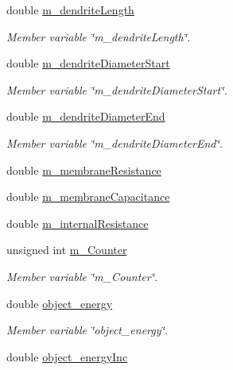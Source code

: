 \begin{DoxyCompactItemize}
\item 
double \mbox{\hyperlink{classDendriteBranch_a0f736fff956d287d66d060865ef0a254}{m\+\_\+dendrite\+Length}}
\begin{DoxyCompactList}\small\item\em Member variable \char`\"{}m\+\_\+dendrite\+Length\char`\"{}. \end{DoxyCompactList}\item 
double \mbox{\hyperlink{classDendriteBranch_a48ffaeeca1f0ffa9245d07f34d768f30}{m\+\_\+dendrite\+Diameter\+Start}}
\begin{DoxyCompactList}\small\item\em Member variable \char`\"{}m\+\_\+dendrite\+Diameter\+Start\char`\"{}. \end{DoxyCompactList}\item 
double \mbox{\hyperlink{classDendriteBranch_ab87dfc434e138ad012bf23d8b8167650}{m\+\_\+dendrite\+Diameter\+End}}
\begin{DoxyCompactList}\small\item\em Member variable \char`\"{}m\+\_\+dendrite\+Diameter\+End\char`\"{}. \end{DoxyCompactList}\item 
double \mbox{\hyperlink{classDendriteBranch_afc2202be6065e3bef5a7024d54f7d4c5}{m\+\_\+membrane\+Resistance}}
\item 
double \mbox{\hyperlink{classDendriteBranch_ac6fb4da55240b7502089d2a29507e05f}{m\+\_\+membrane\+Capacitance}}
\item 
double \mbox{\hyperlink{classDendriteBranch_aefc12ab16c6198a2bd261c47dd148787}{m\+\_\+internal\+Resistance}}
\item 
unsigned int \mbox{\hyperlink{classDendriteBranch_a3c2f2b113bc19eedfb1eead9a477616f}{m\+\_\+\+Counter}}
\begin{DoxyCompactList}\small\item\em Member variable \char`\"{}m\+\_\+\+Counter\char`\"{}. \end{DoxyCompactList}\item 
double \mbox{\hyperlink{classDendriteBranch_a319e6e991af134f8f37bae3ed6da14d2}{object\+\_\+energy}}
\begin{DoxyCompactList}\small\item\em Member variable \char`\"{}object\+\_\+energy\char`\"{}. \end{DoxyCompactList}\item 
double \mbox{\hyperlink{classDendriteBranch_a697663e490708e557511316e798cb7e8}{object\+\_\+energy\+Inc}}
\item 

\end{DoxyCompactItemize}
